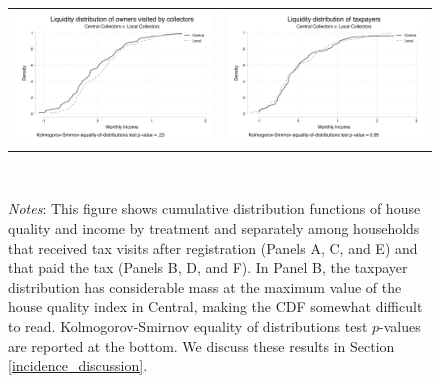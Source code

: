 \documentclass[12pt,english]{article}
\renewcommand{\footnotesize}{\fontsize{9pt}{11pt}\selectfont}\usepackage[unicode=true,
\begin{document}
\begin{figure}[H]
\begin{tabular}{cc}
\includegraphics[scale=.55]{Output/dist_liq_visited.pdf} & \includegraphics[scale=.55]{Output/dist_liq_taxpayers.pdf}\\
\end{tabular}
\usebox{\tablebox}\\[1ex]
\parbox{6in}{\footnotesize \textit{Notes}: This figure shows cumulative distribution functions of house quality and income by treatment and separately among households that received tax visits after registration (Panels A, C, and E) and that paid the tax (Panels B, D, and F). In Panel B, the taxpayer distribution has considerable mass at the maximum value of the house quality index in Central, making the CDF somewhat difficult to read. Kolmogorov-Smirnov equality of distributions test $p$-values are reported at the bottom. We discuss these results in Section \ref{incidence_discussion}.}
\end{figure}
\end{document}
